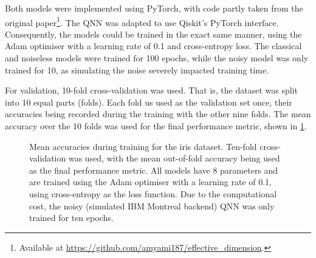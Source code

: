 Both models were implemented using PyTorch, with code partly taken from the original paper\footnote{Available at \url{https://github.com/amyami187/effective_dimension}.}.
The QNN was adapted to use Qiskit's PyTorch interface.
Consequently, the models could be trained in the exact same manner, using the Adam optimiser with a learning rate of 0.1 and cross-entropy loss.
The classical and noiseless models were trained for 100 epochs, while the noisy model was only trained for 10, as simulating the noise severely impacted training time.

For validation, 10-fold cross-validation was used.
That is, the dataset was split into 10 equal parts (folds).
Each fold us used as the validation set once, their accuracies being recorded during the training with the other nine folds.
The mean accuracy over the 10 folds was used for the final performance metric, shown in \cref{fig:iris_training}.

\begin{figure}
    \centering
    \caption{
        Mean accuracies during training for the iris dataset.
        Ten-fold cross-validation was used, with the mean out-of-fold accuracy being used as the final performance metric.
        All models have 8 parameters and are trained using the Adam optimiser with a learning rate of 0.1, using cross-entropy as the loss function.
        Due to the computational cost, the noisy (simulated IBM Montreal backend) QNN was only trained for ten epochs.
    }
    \label{fig:iris_training}
\end{figure}


